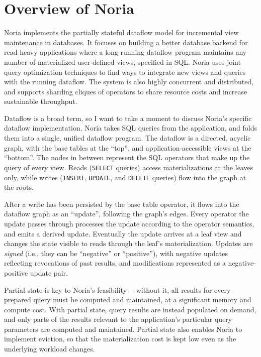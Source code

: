 \documentclass[12pt,letterpaper,twoside]{article}
\begin{document}
\section{Overview of Noria}

Noria implements the partially stateful dataflow model for incremental view
maintenance in databases. It focuses on building a better database backend for
read-heavy applications where a long-running dataflow program maintains any
number of materialized user-defined views, specified in SQL. Noria uses joint
query optimization techniques to find ways to integrate new views and queries
with the running dataflow. The system is also highly concurrent and distributed,
and supports sharding cliques of operators to share resource costs and increase
sustainable throughput.

Dataflow is a broad term, so I want to take a moment to discuss Noria's specific
dataflow implementation. Noria takes SQL queries from the application, and folds
them into a single, unified dataflow program. The dataflow is a directed,
acyclic graph, with the base tables at the ``top'', and application-accessible
views at the ``bottom''. The nodes in between represent the SQL operators that
make up the query of every view. Reads (\texttt{SELECT} queries) access
materializations at the leaves only, while writes (\texttt{INSERT},
\texttt{UPDATE}, and \texttt{DELETE} queries) flow into the graph at the roots.

After a write has been persisted by the base table operator, it flows into the
dataflow graph as an ``update'', following the graph's edges. Every operator the
update passes through processes the update according to the operator semantics,
and emits a derived update. Eventually the update arrives at a leaf view and
changes the state visible to reads through the leaf's materialization. Updates
are \emph{signed} (i.e., they can be ``negative'' or ``positive''), with
negative updates reflecting revocations of past results, and modifications
represented as a negative-positive update pair.

\begin{comment}
My primary work on the paper revolved around the implementation of
partial state, including much of the core dataflow fabric.
\end{comment}

Partial state is key to Noria's feasibility\,---\,without it, all results for
every prepared query must be computed and maintained, at a significant memory
and compute cost. With partial state, query results are instead populated on
demand, and only parts of the results relevant to the application's particular
query parameters are computed and maintained. Partial state also enables Noria
to implement eviction, so that the materialization cost is kept low even as the
underlying workload changes.
\end{document}
